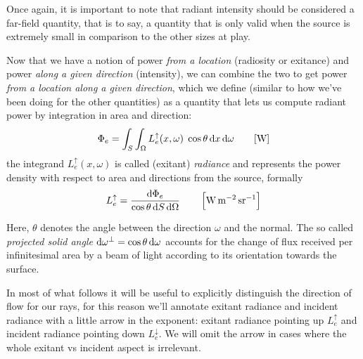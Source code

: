 Once again, it is important to note that radiant intensity should be considered a
\gls{far-field} quantity, that is to say, a quantity that is only valid when
the source is extremely small in comparison to the other sizes at play.

Now that we have a notion of power \textit{from a location} (radiosity or exitance) 
and power \textit{along a given direction} (intensity), we can combine the two to get 
power \textit{from a location along a given direction}, which we define (similar to 
how we've been doing for the other quantities) as a quantity that lets us compute 
radiant power by integration in area and direction:
\begin{equation}
\Phi_e = \int_{S} \int_\Omega L_e^\uparrow(x, \omega) \;\cos\theta\d x\d\omega
\qquad [\unit{\watt}]
\end{equation}
the integrand $L_e^\uparrow(x, \omega)$ is called (exitant) \textsl{\gls{radiance}}
and represents the power density with respect to area and directions from
the source, formally
\begin{equation}
L_e^\uparrow = \frac{\d\Phi_e}{\cos\theta \d S \d\Omega}
\qquad \left[\unit{\watt\per\square\meter\per\steradian}\right]
\end{equation}

Here, $\theta$ denotes the angle between the direction $\omega$ and the normal.
The so called \emph{projected solid angle} $\mathop{}\!\mathrm{d}\omega^\bot = \cos \theta \mathop{}\!\mathrm{d} \omega$
accounts for the change of flux received per infinitesimal area by a beam of light
according to its orientation towards the surface.

In most of what follows it will be useful to explicitly distinguish the direction of
flow for our rays, for this reason we'll annotate \gls{exitant} radiance 
and \gls{incident} radiance with a little arrow in the exponent:
exitant radiance pointing up $L_e^\uparrow$ and incident radiance pointing down
$L_e^\downarrow$. 
We will omit the arrow in cases where the whole exitant vs incident aspect
is irrelevant.



